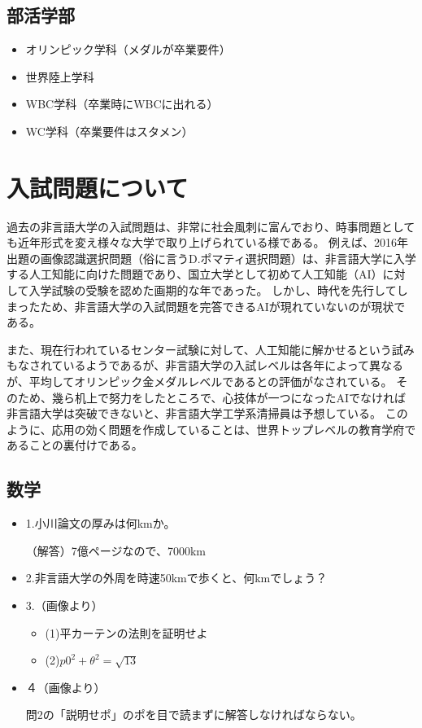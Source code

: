 \subsection{部活学部}
\begin{itemize}
\item オリンピック学科（メダルが卒業要件）
\item 世界陸上学科
\item WBC学科（卒業時にWBCに出れる）
\item WC学科（卒業要件はスタメン）
\end{itemize}


\section{入試問題について}
過去の非言語大学の入試問題は、非常に社会風刺に富んでおり、時事問題としても近年形式を変え様々な大学で取り上げられている様である。
例えば、2016年出題の画像認識選択問題（俗に言うD.ポマティ選択問題）は、非言語大学に入学する人工知能に向けた問題であり、国立大学として初めて人工知能（AI）に対して入学試験の受験を認めた画期的な年であった。
しかし、時代を先行してしまったため、非言語大学の入試問題を完答できるAIが現れていないのが現状である。

また、現在行われているセンター試験に対して、人工知能に解かせるという試みもなされているようであるが、非言語大学の入試レベルは各年によって異なるが、平均してオリンピック金メダルレベルであるとの評価がなされている。
そのため、幾ら机上で努力をしたところで、心技体が一つになったAIでなければ非言語大学は突破できないと、非言語大学工学系清掃員は予想している。
このように、応用の効く問題を作成していることは、世界トップレベルの教育学府であることの裏付けである。

\subsection{数学}

\begin{itemize}
\item 1.小川論文の厚みは何kmか。
\par（解答）7億ページなので、7000km
\item 2.非言語大学の外周を時速50kmで歩くと、何kmでしょう？
\item 3.（画像より）
\begin{itemize}
\item (1)平カーテンの法則を証明せよ
\item (2)$p0^2 + \theta^2 = \sqrt{13}$
\end{itemize}
\item ４（画像より）
\par
問2の「説明せポ」のポを目で読まずに解答しなければならない。
\end{itemize}

